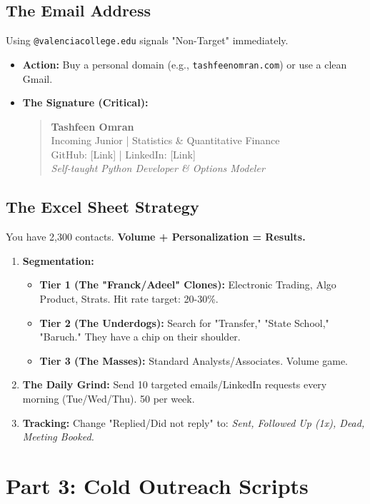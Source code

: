 \documentclass[11pt, a4paper]{article}
\begin{document}
\subsection{The Email Address}
Using \texttt{@valenciacollege.edu} signals "Non-Target" immediately.
\begin{itemize}
    \item \textbf{Action:} Buy a personal domain (e.g., \texttt{tashfeenomran.com}) or use a clean Gmail.
    \item \textbf{The Signature (Critical):}
    \begin{quote}
        \textbf{Tashfeen Omran}\\
        Incoming Junior | Statistics \& Quantitative Finance\\
        GitHub: [Link] | LinkedIn: [Link]\\
        \textit{Self-taught Python Developer \& Options Modeler}
    \end{quote}
\end{itemize}

\subsection{The Excel Sheet Strategy}
You have 2,300 contacts. \textbf{Volume + Personalization = Results.}
\begin{enumerate}
    \item \textbf{Segmentation:}
    \begin{itemize}
        \item \textbf{Tier 1 (The "Franck/Adeel" Clones):} Electronic Trading, Algo Product, Strats. Hit rate target: 20-30\%.
        \item \textbf{Tier 2 (The Underdogs):} Search for "Transfer," "State School," "Baruch." They have a chip on their shoulder.
        \item \textbf{Tier 3 (The Masses):} Standard Analysts/Associates. Volume game.
    \end{itemize}
    \item \textbf{The Daily Grind:} Send 10 targeted emails/LinkedIn requests every morning (Tue/Wed/Thu). 50 per week.
    \item \textbf{Tracking:} Change "Replied/Did not reply" to: \textit{Sent, Followed Up (1x), Dead, Meeting Booked.}
\end{enumerate}

\section{Part 3: Cold Outreach Scripts}
\end{document}
